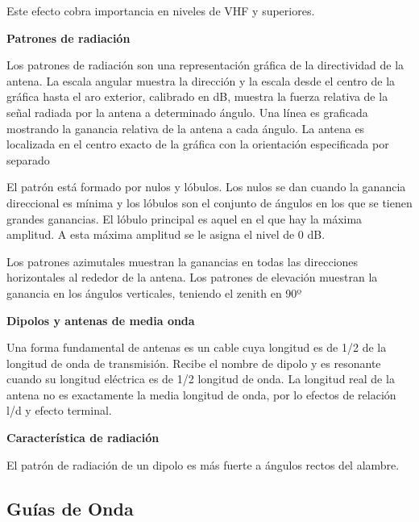 \documentclass[12pt,letterpaper,titlepage,twoside]{book}
\begin{document}
Este efecto cobra importancia en niveles de VHF y superiores.

\textbf{Patrones de radiación}

Los patrones de radiación son una representación gráfica de la directividad de la antena. La escala angular muestra la dirección y la escala desde el centro de la gráfica hasta el aro exterior, calibrado en dB, muestra la fuerza relativa de la señal radiada por la antena a determinado ángulo. Una línea es graficada mostrando la ganancia relativa de la antena a cada ángulo. La antena es localizada en el centro exacto de la gráfica con la orientación especificada por separado

El patrón está formado por nulos y lóbulos. Los nulos se dan cuando la ganancia direccional es mínima y los lóbulos son el conjunto de ángulos en los que se tienen grandes ganancias. El lóbulo principal es aquel en el que hay la máxima amplitud. A esta máxima amplitud se le asigna el nivel de 0 dB.

Los patrones azimutales muestran la ganancias en todas las direcciones horizontales 	al rededor de la antena. Los patrones de elevación muestran la ganancia en los ángulos verticales, teniendo el zenith en 90º


\textbf{Dipolos y antenas de media onda}

Una forma fundamental de antenas es un cable cuya longitud es de 1/2 de la longitud de onda de transmisión. Recibe el nombre de dipolo y es resonante cuando su longitud eléctrica es de 1/2 longitud de onda. La longitud real de la antena no es exactamente la media longitud de onda, por lo efectos de relación l/d y efecto terminal.

\textbf{Característica de radiación}

El patrón de radiación de un dipolo es más fuerte a ángulos rectos del alambre.






  
\subsection{Guías de Onda}
\end{document}
